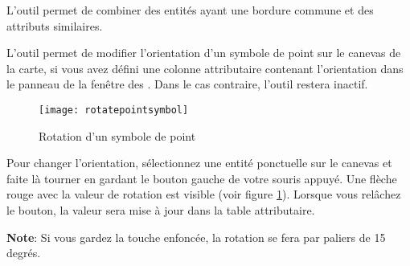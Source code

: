 L'outil  permet de combiner des entités ayant une bordure commune et des attributs similaires.



L'outil  permet de modifier l'orientation d'un symbole de point sur le canevas de la carte, si vous avez défini une colonne attributaire contenant l'orientation dans le panneau  de la fenêtre des . Dans le cas contraire, l'outil restera inactif.

\begin{figure}[ht]
   \centering
   \texttt{[image: rotatepointsymbol]}
   \caption{Rotation d'un symbole de point \nixcaption}\label{fig:rotatepoint}
\end{figure}

Pour changer l'orientation, sélectionnez une entité ponctuelle sur le canevas et faite là tourner en gardant le bouton gauche de votre souris appuyé. Une flèche rouge avec la valeur de rotation est visible (voir figure \ref{fig:rotatepoint}). Lorsque vous relâchez le bouton, la valeur sera mise à jour dans la table attributaire.

\textbf{Note}: Si vous gardez la touche  enfoncée, la rotation se fera par paliers de 15 degrés.

